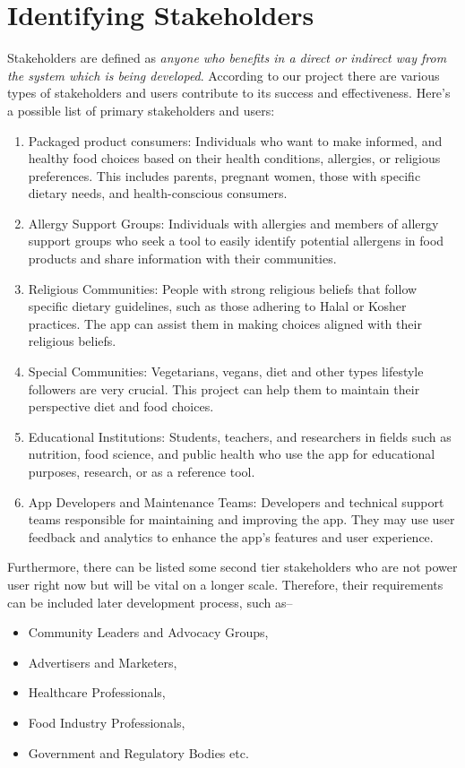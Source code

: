 \documentclass[a4paper,12pt]{report}
\begin{document}
\section*{Identifying Stakeholders}
Stakeholders are defined as \emph{anyone who benefits
	in a direct or indirect way from the system which is being developed}.
According to our project there are various types of stakeholders and users contribute to its success and effectiveness. Here's a possible list of primary stakeholders and users:
\begin{enumerate}
	\item Packaged product consumers: Individuals who want to make informed, and healthy food choices based on their health conditions, allergies, or religious preferences. This includes parents, pregnant women, those with specific dietary needs, and health-conscious consumers.
	\item Allergy Support Groups: Individuals with allergies and members of allergy support groups who seek a tool to easily identify potential allergens in food products and share information with their communities.
	\item Religious Communities: People with strong religious beliefs that follow specific dietary guidelines, such as those adhering to Halal or Kosher practices. The app can assist them in making choices aligned with their religious beliefs.
	\item Special Communities: Vegetarians, vegans, diet and other types lifestyle followers are very crucial. This project can help them to maintain their perspective diet and food choices.
	\item Educational Institutions: Students, teachers, and researchers in fields such as nutrition, food science, and public health who use the app for educational purposes, research, or as a reference tool.
	\item App Developers and Maintenance Teams: Developers and technical support teams responsible for maintaining and improving the app. They may use user feedback and analytics to enhance the app's features and user experience.
\end{enumerate}

Furthermore, there can be listed some second tier stakeholders who are not power user right now but will be vital on a longer scale. Therefore, their requirements can be included later development process, such as--
\begin{itemize}
	\item Community Leaders and Advocacy Groups,
	\item Advertisers and Marketers,
	\item Healthcare Professionals,
	\item Food Industry Professionals,
	\item Government and Regulatory Bodies etc.
\end{itemize}
\end{document}
